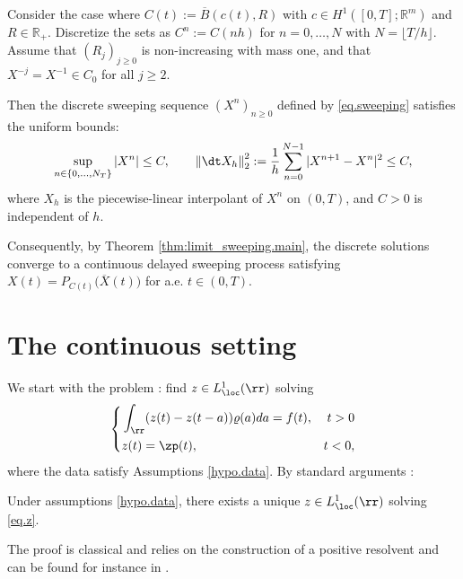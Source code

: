 \documentclass[]{jnsao}
\newcommand{\kernel}{\varrho}
\renewcommand{\tr}{R}
\begin{document}
\begin{theorem}\label{thm:circular.main}
	Consider the case where $C(t) := \overline{B}(c(t), R)$ with $c \in H^1([0,T];\mathbb{R}^m)$ and $R \in \mathbb{R}_+$.
	Discretize the sets as $C^n := C(nh)$ for $n=0,\dots,N$ with $N = \lfloor T/h \rfloor$.
	Assume that $(\tr_j)_{j\geq 0}$ is non-increasing with mass one, and that $X^{-j} = X^{-1} \in C_0$ for all $j\geq 2$.
	
	Then the discrete sweeping sequence $(X^n)_{n\ge0}$ defined by \eqref{eq.sweeping} satisfies the uniform bounds:
	\[
	\sup_{n\in \{0,\dots,N_T\}}|X^n|\le C,\qquad
	\left\| \dt X_h \right\|^2_2 := \frac{1}{h}\sum_{n=0}^{N-1} |X^{n+1}-X^n|^2  \le C,
	\]
	where $X_{h}$ is the piecewise-linear interpolant of $X^n$ on $(0,T)$, and $C>0$ is independent of $h$.
	
	Consequently, by Theorem \ref{thm:limit_sweeping.main}, the discrete solutions converge to a continuous delayed sweeping process satisfying $X(t)=P_{C(t)}\big(\overline{X}(t)\big)$ for a.e. $t\in(0,T)$.
\end{theorem}


\section{The continuous setting}\label{sec:continuous} 

We start with the problem : find $z \in L^1_\loc(\rr)$ solving  
\begin{equation}\label{eq.z}
	\left\{\begin{aligned}
& 	\int_\rr (z(t)- z(t-a)) \kernel(a) da = f(t), & t>0 \\
& 	z(t) = \zp(t), & t<0,
	\end{aligned}\right.
\end{equation}
where the data satisfy Assumptions \ref{hypo.data}. 
By standard arguments :
\begin{theorem}
	Under assumptions \ref{hypo.data}, there exists a unique $z \in L^1_\loc(\rr)$ solving \eqref{eq.z}.
\end{theorem}
\noindent The proof is classical and relies on the construction of a positive resolvent and  can be found for instance in \cite[Theorem 3.5, p. 44]{grip}.
\end{document}
